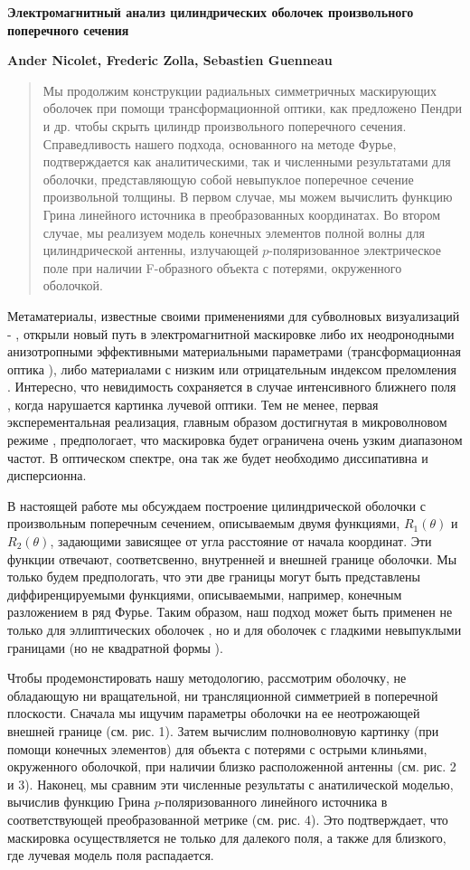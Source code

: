 \documentclass[a4paper, 12pt]{article}
\newcommand{\tit}[1]{\begin{center}{\bf{\Large #1}}\end{center}}
\newcommand{\aut}[1]{\centerline{{\bf #1}}}
\begin{document}
\sloppy
\tit{Электромагнитный анализ цилиндрических оболочек произвольного поперечного
сечения}
 \aut{Ander Nicolet, Frederic Zolla, Sebastien Guenneau}

\begin{abstract}
Мы продолжим конструкции радиальных симметричных маскирующих оболочек
при помощи трансформационной оптики, как предложено Пендри и др.
чтобы скрыть цилиндр произвольного поперечного сечения.
Справедливость нашего подхода, основанного на методе Фурье, подтверждается
как аналитическими, так и численными результатами для оболочки, представляющую
собой невыпуклое поперечное сечение произвольной толщины. В первом случае,
мы можем вычислить функцию Грина линейного источника в преобразованных
координатах. Во втором случае, мы реализуем модель конечных элементов 
полной волны для цилиндрической антенны, излучающей $p$-поляризованное
электрическое поле при наличии F-образного объекта с потерями, 
окруженного оболочкой.
\end{abstract}

Метаматериалы, известные своими применениями для субволновых визуализаций \cite{1}-
\cite{3}, открыли новый путь в электромагнитной маскировке либо их
неодронодными анизотропными эффективными материальными параметрами
(трансформационная оптика \cite{4,5}), либо материалами с низким \cite{6} или отрицательным индексом преломления \cite{7}. Интересно, что невидимость
сохраняется в случае интенсивного ближнего поля \cite{8}, когда нарушается
картинка лучевой оптики. Тем не менее, первая эксперементальная реализация,
главным образом достигнутая в микроволновом режиме \cite{9}, предпологает,
что маскировка будет ограничена очень узким диапазоном частот. В оптическом
спектре, она так же будет необходимо диссипативна и дисперсионна.

В настоящей работе мы обсуждаем построение цилиндрической оболочки с произвольным 
поперечным сечением, описываемым двумя функциями, $R_1(\theta)$ и $R_2(\theta)$,
задающими зависящее от угла расстояние от начала координат. Эти функции отвечают,
соответсвенно, внутренней и внешней границе оболочки. Мы только будем
предпологать, что эти две границы могут быть представлены диффиренцируемыми
функциями, описываемыми, например, конечным разложением в ряд Фурье.
Таким образом, наш подход может быть применен не только для эллиптических оболочек
\cite{11,12}, но и для оболочек с гладкими невыпуклыми границами (но не квадратной 
формы \cite{13}).

Чтобы продемонстировать нашу методологию, рассмотрим оболочку, не обладающую ни
вращательной, ни трансляционной симметрией в поперечной плоскости. Сначала
мы ищучим параметры оболочки на ее неотрожающей внешней границе (см. рис. 1).
Затем вычислим полноволновую картинку (при помощи конечных элементов)
для объекта с потерями с острыми клиньями, окруженного оболочкой, при наличии
близко расположенной антенны (см. рис. 2 и 3). Наконец, мы сравним эти
численные результаты с анатилической моделью, вычислив функцию Грина
$p$-поляризованного линейного источника в соответствующей преобразованной
метрике (см. рис. 4). Это подтверждает, что маскировка осуществляется не только
для далекого поля, а также для близкого, где лучевая модель поля распадается.
\end{document}
